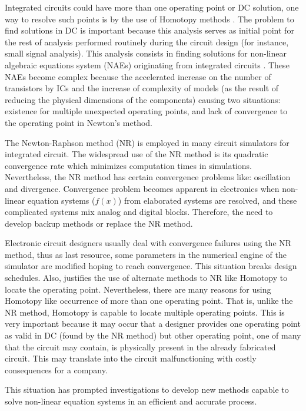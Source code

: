 \documentclass[journal,twocolumn]{IEEEtran}
\begin{document}
Integrated circuits could have more than one operating point or DC solution, one way to resolve such points is by the use of Homotopy methods \cite{cont_chu1}. The problem to find solutions in DC is important because this analysis serves as initial point for the rest of analysis performed routinely during the circuit design (for instance, small signal analysis)\cite{homo_ogrodzki}. This analysis consists in finding solutions for non-linear algebraic equations system (NAEs) originating from integrated circuits \cite{Schwa_book}. These NAEs become complex because the accelerated increase on the number of transistors by ICs and the increase of complexity of models (as the result of reducing the physical dimensions of the components) causing two situations: existence for multiple unexpected operating points, and lack of convergence to the operating point in Newton's method.

The Newton-Raphson method (NR) is employed in many circuit simulators for integrated circuit. The widespread use of the NR method is its quadratic convergence rate \cite{homo_ogrodzki,cont_quasi} which minimizes computation times in simulations. Nevertheless, the NR method has certain convergence problems \cite{cont_quasi,Schwa_book} like: oscillation and divergence. Convergence problem becomes apparent in electronics when non-linear equation systems ($f(x)$) from elaborated systems are resolved, and these complicated systems mix analog and digital blocks. Therefore, the need to develop backup methods or replace the NR method.

Electronic circuit designers usually deal with convergence failures using the NR method, thus as  last resource, some parameters in the numerical engine of the simulator are modified hoping to reach convergence. This situation breaks design schedules. Also, justifies the use of alternate methods to NR like Homotopy to locate the operating point. Nevertheless, there are many reasons for using Homotopy like occurrence of more than one operating point. That is, unlike the NR method, Homotopy is capable to locate multiple operating points. This is very important because it may occur that a designer provides one operating point as valid in DC (found by the NR method) but other operating point, one of many that the circuit may contain, is physically present in the already fabricated circuit. This may translate into the circuit  malfunctioning  with costly consequences for a company.

This situation has prompted investigations to develop new methods capable to solve non-linear equation systems in an efficient and accurate process.
\end{document}
